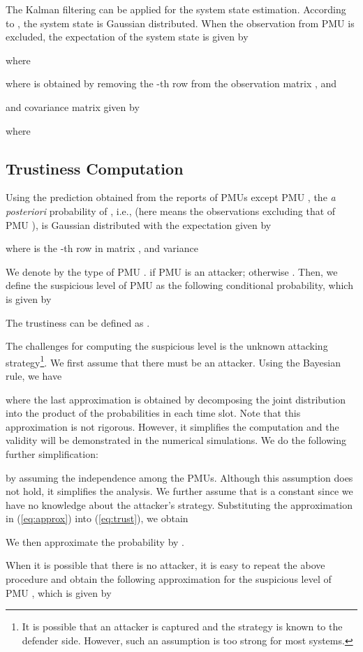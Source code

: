 \documentclass[journal,10pt,twocolumn]{IEEEtran}
\begin{document}
The Kalman filtering can be applied for the system state estimation. According to \cite{Poor1994}, the system state  is Gaussian distributed. When the observation  from PMU  is excluded, the expectation of the system state is given by

where

where  is obtained by removing the -th row from the observation matrix , and

and covariance matrix given by

where


\subsection{Trustiness Computation}
Using the prediction obtained from the reports of PMUs except PMU , the {\em a posteriori} probability of , i.e.,  (here  means the observations excluding that of PMU ), is Gaussian distributed with the expectation given by

where  is the -th row in matrix , and variance


We denote by  the type of PMU .  if PMU  is an attacker; otherwise . Then, we define the suspicious level of PMU  as the following conditional probability, which is given by

The trustiness can be defined as .

The challenges for computing the suspicious level is the unknown attacking strategy\footnote{It is possible that an attacker is captured and the strategy is known to the defender side. However, such an assumption is too strong for most systems.}. We first assume that there must be an attacker. Using the Bayesian rule, we have

where the last approximation is obtained by decomposing the joint distribution into the product of the probabilities in each time slot. Note that this approximation is not rigorous. However, it simplifies the computation and the validity will be demonstrated in the numerical simulations. We do the following further simplification:

by assuming the independence among the PMUs. Although this assumption does not hold, it simplifies the analysis. We further assume that  is a constant since we have no knowledge about the attacker's strategy. Substituting the approximation in (\ref{eq:approx}) into (\ref{eq:trust}), we obtain

We then approximate the probability  by .

When it is possible that there is no attacker, it is easy to repeat the above procedure and obtain the following approximation for the suspicious level of PMU , which is given by
\end{document}
